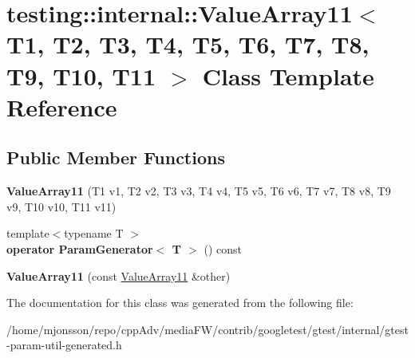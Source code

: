 \hypertarget{classtesting_1_1internal_1_1ValueArray11}{}\section{testing\+:\+:internal\+:\+:Value\+Array11$<$ T1, T2, T3, T4, T5, T6, T7, T8, T9, T10, T11 $>$ Class Template Reference}
\label{classtesting_1_1internal_1_1ValueArray11}
\subsection*{Public Member Functions}
\begin{DoxyCompactItemize}
\item 
\mbox{\label{classtesting_1_1internal_1_1ValueArray11_a2b26f49e7c5856e86f4fae360cd22d47}} 
{\bfseries Value\+Array11} (T1 v1, T2 v2, T3 v3, T4 v4, T5 v5, T6 v6, T7 v7, T8 v8, T9 v9, T10 v10, T11 v11)
\item 
\mbox{\label{classtesting_1_1internal_1_1ValueArray11_a3042498fcde8d1c91df474e618416f28}} 
{\footnotesize template$<$typename T $>$ }\\{\bfseries operator Param\+Generator$<$ T $>$} () const
\item 
\mbox{\label{classtesting_1_1internal_1_1ValueArray11_a09b4890b05313d04d98cbb5507d9b34e}} 
{\bfseries Value\+Array11} (const \hyperlink{classtesting_1_1internal_1_1ValueArray11}{Value\+Array11} \&other)
\end{DoxyCompactItemize}


The documentation for this class was generated from the following file\+:\begin{DoxyCompactItemize}
\item 
/home/mjonsson/repo/cpp\+Adv/media\+F\+W/contrib/googletest/gtest/internal/gtest-\/param-\/util-\/generated.\+h\end{DoxyCompactItemize}
